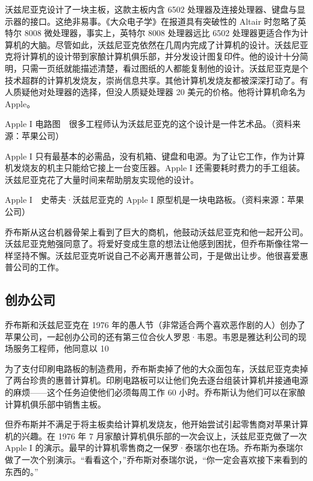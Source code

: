 \documentclass[12pt,UTF8]{ctexbook}
\begin{document}
沃兹尼亚克设计了一块主板，这款主板内含 6502 处理器及连接处理器、键盘与显示器的接口。这绝非易事。《大众电子学》在报道具有突破性的 Altair 时忽略了英特尔 8008 微处理器，事实上，英特尔 8008 处理器远比 6502 处理器更适合作为计算机的大脑。尽管如此，沃兹尼亚克依然在几周内完成了计算机的设计。沃兹尼亚克将计算机的设计带到家酿计算机俱乐部，并分发设计图复印件。他的设计十分简明，只需一页纸就能描述清楚，看过图纸的人都能复制他的设计。沃兹尼亚克是个技术超群的计算机发烧友，崇尚信息共享。其他计算机发烧友都被深深打动了。有人质疑他对处理器的选择，但没人质疑处理器 20 美元的价格。他将计算机命名为 Apple。



Apple I 电路图　很多工程师认为沃兹尼亚克的这个设计是一件艺术品。（资料来源：苹果公司）

Apple I 只有最基本的必需品，没有机箱、键盘和电源。为了让它工作，作为计算机发烧友的机主只能给它接上一台变压器。Apple I 还需要耗时费力的手工组装。沃兹尼亚克花了大量时间来帮助朋友实现他的设计。



Apple I　史蒂夫·沃兹尼亚克的 Apple I 原型机是一块电路板。（资料来源：苹果公司）

乔布斯从这台机器骨架上看到了巨大的商机，他鼓动沃兹尼亚克和他一起开公司。沃兹尼亚克勉强同意了。将爱好变成生意的想法让他感到困扰，但乔布斯像往常一样坚持不懈。沃兹尼亚克听说自己不必离开惠普公司，于是做出让步。他很喜爱惠普公司的工作。





\subsection{创办公司}


乔布斯和沃兹尼亚克在 1976 年的愚人节（非常适合两个喜欢恶作剧的人）创办了苹果公司，一起创办公司的还有第三位合伙人罗恩·韦恩。韦恩是雅达利公司的现场服务工程师，他同意以 10%

为了支付印刷电路板的制造费用，乔布斯卖掉了他的大众面包车，沃兹尼亚克卖掉了两台珍贵的惠普计算机。印刷电路板可以让他们免去逐台组装计算机并接通电源的麻烦——这个任务迫使他们必须每周工作 60 小时。乔布斯认为他们可以在家酿计算机俱乐部中销售主板。

但乔布斯并不满足于将主板卖给计算机发烧友，他开始尝试引起零售商对苹果计算机的兴趣。在 1976 年 7 月家酿计算机俱乐部的一次会议上，沃兹尼亚克做了一次 Apple I 的演示。最早的计算机零售商之一保罗·泰瑞尔也在场。乔布斯为泰瑞尔做了一次个别演示。“看看这个，”乔布斯对泰瑞尔说，“你一定会喜欢接下来看到的东西的。”
\end{document}
